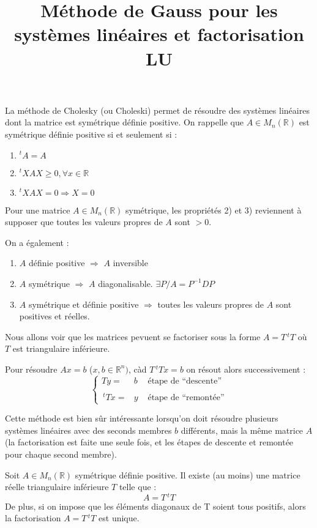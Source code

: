 \documentclass[a4paper,11pt]{article}
\title{\huge \bfseries Méthode de Gauss pour les systèmes linéaires et factorisation LU}
\date{}
\newcommand{\R}{\mathbb{R}}
\newcommand{\tpo}[1]{\,^t#1}
\theoremstyle{plain} %
\begin{document}
\maketitle

La méthode de Cholesky (ou Choleski) permet de résoudre des systèmes linéaires
dont la matrice est symétrique définie positive. On rappelle que
$A \in M_n(\R)$ est symétrique définie positive si et seulement si :
\begin{enumerate}
    \item $^tA = A$
    \item $^tXAX \geq 0, \forall x \in \R$
    \item $^tXAX = 0 \Rightarrow X = 0$
\end{enumerate}
Pour une matrice $A \in M_n(\R)$ symétrique, les propriétés 2) et 3) reviennent à supposer que toutes les valeurs propres de $A$ sont $> 0$.

On a également :
\begin{enumerate}
    \item $A$ définie positive $\Rightarrow$ $A$ inversible
    \item $A$ symétrique $\Rightarrow$ $A$ diagonalisable. $\exists P / A = P^{-1}DP$
    \item $A$ symétrique et définie positive $\Rightarrow$ toutes les valeurs propres de $A$ sont positives et réelles.
\end{enumerate}

Nous allons voir que les matrices pevuent se factoriser sous la forme $A = T\tpo{T}$ où
$T$ est triangulaire inférieure.

Pour résoudre $Ax = b$ ($x,b \in \R^n)$, càd $T\tpo{T}x=b$ on résout alors successivement :
\begin{equation*}
\left\lbrace
    \begin{array}{ccc}
        Ty  = & b & \text{ étape de ``descente''}\\
        \\
        \tpo{T}x  = & y & \text{ étape de ``remontée''}
    \end{array}
\right.
\end{equation*}

Cette méthode est bien sûr intéressante lorsqu'on doit résoudre plusieurs systèmes linéaires
avec des seconds membres $b$ différents, mais la même matrice $A$ (la factorisation est faite
une seule fois, et les étapes de descente et remontée pour chaque second membre).


\begin{ftheo}
    Soit $A \in M_n(\R)$ symétrique définie positive. Il existe (au moins) une matrice réelle triangulaire inférieure $T$ telle que :
    \[
        A = T \,^tT
    \]
    De plus, si on impose que les éléments diagonaux de T soient tous positifs, alors la factorisation $A = T \,^tT$ est unique.
\end{ftheo}
\end{document}
